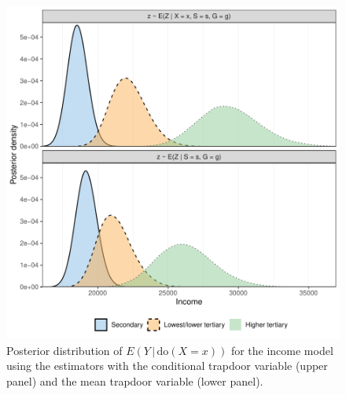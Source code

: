 \documentclass{statsoc}
\newcommand{\+}[1]{\ensuremath{\mathbf{#1}}}
\newcommand{\doo}{\textrm{do}}
\newcommand{\given}{{ \, | \, }}
\newcommand{\z}{trapdoor variable}
\begin{document}
\begin{figure}[!hb]
	\includegraphics[width=\textwidth]{figures/fsd_posterior_mean.pdf} 
	\caption{Posterior distribution of $E(Y \given  \doo(X = x))$ for the income model using the estimators with the conditional \z{} (upper panel) and the mean \z{} (lower panel).}
	\label{fig:fsd-posterior-mean}
\end{figure}
\end{document}
